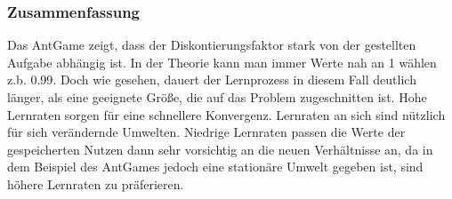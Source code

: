 \subsubsection{Zusammenfassung}
Das AntGame zeigt, dass der Diskontierungsfaktor stark von der gestellten Aufgabe abhängig ist. In der Theorie kann man immer Werte nah an 1 wählen z.b. 0.99. Doch wie gesehen, dauert der Lernprozess in diesem Fall deutlich länger, als eine geeignete Größe, die auf das Problem zugeschnitten ist. Hohe Lernraten sorgen für eine schnellere Konvergenz. Lernraten an sich sind nützlich für sich verändernde Umwelten. Niedrige Lernraten passen die Werte der gespeicherten Nutzen dann sehr vorsichtig an die neuen Verhältnisse an, da in dem Beispiel des AntGames jedoch eine stationäre Umwelt gegeben ist, sind höhere Lernraten zu präferieren.